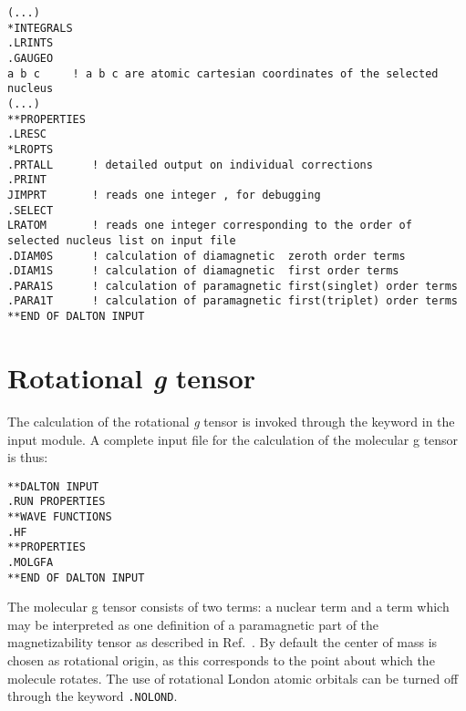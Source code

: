 \begin{verbatim}
(...)
*INTEGRALS
.LRINTS
.GAUGEO 
a b c     ! a b c are atomic cartesian coordinates of the selected nucleus
(...)
**PROPERTIES
.LRESC
*LROPTS
.PRTALL      ! detailed output on individual corrections
.PRINT
JIMPRT       ! reads one integer , for debugging
.SELECT
LRATOM       ! reads one integer corresponding to the order of selected nucleus list on input file 
.DIAM0S      ! calculation of diamagnetic  zeroth order terms
.DIAM1S      ! calculation of diamagnetic  first order terms
.PARA1S      ! calculation of paramagnetic first(singlet) order terms
.PARA1T      ! calculation of paramagnetic first(triplet) order terms
**END OF DALTON INPUT
\end{verbatim}






\section{Rotational {\em g} tensor}\label{sec:gfac}

\begin{center}
\end{center}

The calculation of the rotational  {\em g} tensor is invoked through the
keyword  in the  input module. A complete
input file for the calculation of the molecular g tensor is thus:

\begin{verbatim}
**DALTON INPUT
.RUN PROPERTIES
**WAVE FUNCTIONS
.HF
**PROPERTIES
.MOLGFA
**END OF DALTON INPUT
\end{verbatim}

The molecular g tensor consists of two terms: a nuclear term and a
term which may be interpreted as one definition of a paramagnetic part
of the magnetizability tensor as
described in Ref.~\cite{jgkrthjcp105}.
By default the center of mass is chosen as
rotational origin, as this corresponds to the point about which the
molecule rotates. The use of
rotational London atomic
orbitals can be turned off through
the keyword \verb|.NOLOND|.

